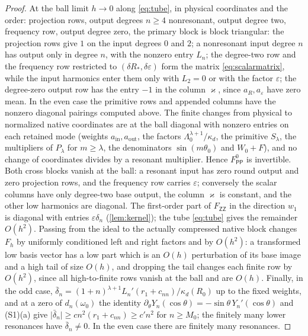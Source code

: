\documentclass[11pt]{amsart}
\numberwithin{equation}{section}
\theoremstyle{definition}
\theoremstyle{remark}
\newcommand{\eps}{\varepsilon}
\newcommand{\abs}[1]{\lvert #1\rvert}
\begin{document}
\begin{proof}
At the ball limit $h\to0$ along \eqref{eq:tube}, in physical coordinates and the order: projection rows, output degrees $n\ge4$ nonresonant, output degree two, frequency row, output degree zero, the primary block is block triangular: the projection rows give $1$ on the input degrees $0$ and $2$; a nonresonant input degree $n$ has output only in degree $n$, with the nonzero entry $L_n$; the degree-two row and the frequency row restricted to $(\delta R_*,\delta\eps)$ form the matrix \eqref{eq:scalarmatrix}, while the input harmonics enter them only with $L_2=0$ or with the factor $\eps$; the degree-zero output row has the entry $-1$ in the column $\varkappa$, since $a_R,a_\eps$ have zero mean. In the even case the primitive rows and appended columns have the nonzero diagonal pairings computed above. The finite changes from physical to normalized native coordinates are at the ball diagonal with nonzero entries on each retained mode (weights $a_{\mathrm{in}},a_{\mathrm{out}}$, the factors $\Lambda_0^{\lambda+1}/\kappa_d$, the primitive $S_\lambda$, the multipliers of $P_\lambda$ for $m\ge\lambda$, the denominators $\sin(m\theta_0)$ and $W_0+F$), and no change of coordinates divides by a resonant multiplier. Hence $F^0_{\mathsf{PP}}$ is invertible. Both cross blocks vanish at the ball: a resonant input has zero round output and zero projection rows, and the frequency row carries $\eps$; conversely the scalar columns have only degree-two base output, the column $\varkappa$ is constant, and the other low harmonics are diagonal. The first-order part of $F_{\mathsf{ZZ}}$ in the direction $w_1$ is diagonal with entries $\eps\delta_n$ (\cref{lem:kernel}); the tube \eqref{eq:tube} gives the remainder $O(h^2)$. Passing from the ideal to the actually compressed native block changes $F_h$ by uniformly conditioned left and right factors and by $O(h^2)$: a transformed low basis vector has a low part which is an $O(h)$ perturbation of its base image and a high tail of size $O(h)$, and dropping the tail changes each finite row by $O(h^2)$, since all high-to-finite rows vanish at the ball and are $O(h)$. Finally, in the odd case, $\bar\delta_n=(1+n)^{\lambda+1}L_n'(r_1+c_{nn})/\kappa_d(R_0)$ up to the fixed weights, and at a zero of $d_n(\omega_0)$ the identity $\partial_\theta Y_n(\cos\theta)=-\sin\theta\,Y_n'(\cos\theta)$ and (S1)(a) give $\abs{\bar\delta_n}\ge cn^2(r_1+c_{nn})\ge c'n^2$ for $n\ge M_0$; the finitely many lower resonances have $\bar\delta_n\ne0$. In the even case there are finitely many resonances.
\end{proof}
\end{document}
